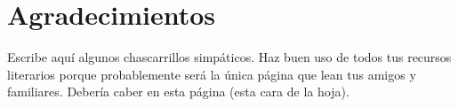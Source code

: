 \chapter{Agradecimientos}

Escribe aquí algunos chascarrillos simpáticos. Haz buen uso de todos tus
recursos literarios porque probablemente será la única página que lean tus
amigos y familiares. Debería caber en esta página (esta cara de la hoja).


